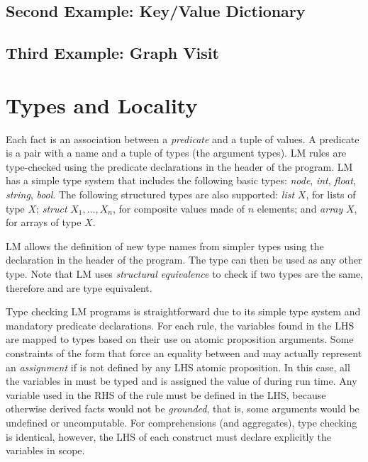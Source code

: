 \subsection{Second Example: Key/Value Dictionary}\label{sec:language:key_value}


\subsection{Third Example: Graph Visit}


\section{Types and Locality}

Each fact is an association between a \emph{predicate} and a tuple of values. A
predicate is a pair with a name and a tuple of types (the argument types). LM
rules are type-checked using the predicate declarations in the header of the
program. LM has a simple type system that includes the following basic types:
\emph{node}, \emph{int}, \emph{float}, \emph{string}, \emph{bool}. The following
structured types are also supported: \emph{list} $X$, for lists of type $X$;
\emph{struct} $X_1, \ldots, X_n$, for composite values made of $n$ elements; and
\emph{array} $X$, for arrays of type $X$.

LM allows the definition of new type names from simpler types using the
declaration  in the header of the program. The
type  can then be used as any other type. Note that LM uses
\emph{structural equivalence} to check if two types are the same, therefore
 and  are type equivalent.

Type checking LM programs is straightforward due to its simple type system and
mandatory predicate declarations. For each rule, the variables found in the LHS
are mapped to types based on their use on atomic proposition arguments. Some
constraints of the form  that force an equality between
 and  may actually represent an \emph{assignment} if
 is not defined by any LHS atomic proposition. In this case, all the
variables in  must be typed and  is assigned the value
of  during run time.  Any variable used in the RHS of the rule
must be defined in the LHS, because otherwise derived facts would not be
\emph{grounded}, that is, some arguments would be undefined or uncomputable.
For comprehensions (and aggregates), type checking is identical, however, the LHS
of each construct must declare explicitly the variables in scope.

